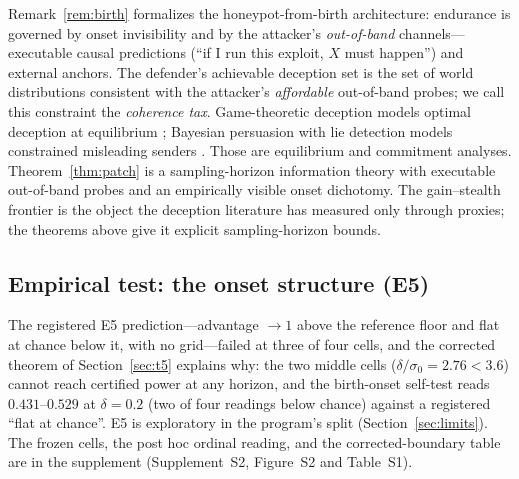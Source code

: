 Remark~\ref{rem:birth} formalizes the honeypot-from-birth
architecture: endurance is governed by onset invisibility and by the
attacker's \emph{out-of-band} channels---executable causal predictions (``if
I run this exploit, $X$ must happen'') and external anchors. The defender's
achievable deception set is the set of world distributions consistent with
the attacker's \emph{affordable} out-of-band probes; we call this constraint
the \emph{coherence tax}. Game-theoretic deception models optimal deception
at equilibrium \cite{nguyen2019}; Bayesian persuasion with lie detection
models constrained misleading senders \cite{kamenica2011,nberlie}. Those are
equilibrium and commitment analyses. Theorem~\ref{thm:patch} is a
sampling-horizon information theory with executable out-of-band probes and
an empirically visible onset dichotomy. The gain--stealth frontier is the
object the deception literature has measured only through proxies; the
theorems above give it explicit sampling-horizon bounds.

\subsection{Empirical test: the onset structure (E5)}\label{sec:e5}
The registered E5 prediction---advantage $\to1$ above the reference floor and
flat at chance below it, with no grid---failed at three of four cells, and
the corrected theorem of Section~\ref{sec:t5} explains why: the two middle
cells ($\delta/\sigma_0=2.76<3.6$) cannot reach certified power at any
horizon, and the birth-onset self-test reads $0.431$--$0.529$ at
$\delta=0.2$ (two of four readings below chance) against a registered
``flat at chance''. E5 is exploratory in the program's split
(Section~\ref{sec:limits}). The frozen cells, the post hoc ordinal reading,
and the corrected-boundary table are in the supplement (Supplement~S2,
Figure~S2 and Table~S1).
